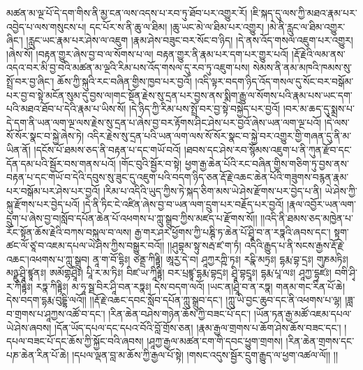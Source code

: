 མཚན་མ་ལྔ་པོ་དེ་དག་གིས་ནི་མྱ་ངན་ལས་འདས་པ་རབ་ཏུ་ཐོབ་པར་འགྱུར་རོ། །ཇི་སྐད་དུ་ལས་ཀྱི་མཐའ་རྣམ་པར་འབྱེད་པ་ལས་གསུངས་པ། དང་པོར་ས་ནི་ཆུ་ལ་ཐིམ། །ཆུ་ཡང་མེ་ལ་ཐིམ་པར་འགྱུར། །མེ་ནི་རླུང་ལ་ཐིམ་འགྱུར་ཞིང་། །རླུང་ཡང་རྣམ་པར་ཤེས་ལ་འཇུག །རྣམ་ཤེས་བཟུང་བར་སོང་བ་ཉིད། །དེ་ནས་འོད་གསལ་འཇུག་པར་འགྱུར། །ཞེས་སོ། །བརྟན་གྱུར་ཞེས་བྱ་བ་ལ་སོགས་པ་ལ། བརྟན་གྱུར་ནི་རྣམ་པར་དག་པར་གྱུར་པའོ། །རྡོ་རྗེའི་ལམ་ནས་འདའ་བར་མི་བྱ་བའི་མཚན་མ་ལྔའི་རིམ་པས་འོད་གསལ་དུ་རབ་ཏུ་འཇུག་པས། སེམས་ནི་ནམ་མཁའི་ཁམས་སུ་སྤྲོ་བར་བྱ་ཞིང་། ཆོས་ཀྱི་སྐུའི་རང་བཞིན་གྱིས་ཁྱབ་པར་བྱའོ། །འདི་ལྟར་བདག་ཉིད་འོད་གསལ་དུ་སོང་བར་བསྒོམ་པར་བྱ་བ་སྟེ་མངོན་སུམ་དུ་བྱས་ལ།གང་སྔོན་རྗེས་སུ་དྲན་པར་བྱས་ནས་སྨིག་རྒྱུ་ལ་སོགས་པའི་རྣམ་པས་ཡང་དག་པའི་མཐའ་ཐོབ་པ་དེའི་རྣམ་པ་ཡིས་སོ། །དེ་ཉིད་ཀྱི་རིམ་པས་སྤྲོ་བར་བྱ་སྟེ་བསྐྱེད་པར་བྱའོ། །བར་མ་ཆད་དུ་སྨྲས་པ་དེ་དག་ནི་ཡན་ལག་ལྔ་ལས་རྗེས་སུ་དྲན་པ་ཞེས་བྱ་བར་རྟོགས་ཤིང་ཤེས་པར་བྱའོ་ཞེས་ཡན་ལག་ལྔ་པའོ། །དེ་ལས་སོ་སོར་སྣང་བ་སྐྱེ་ཞེས་ཏེ། འདིར་རྗེས་སུ་དྲན་པའི་ཡན་ལག་ལས་སོ་སོར་སྣང་བ་སྐྱེ་བར་འགྱུར་གྱི་གཞན་དུ་ནི་མ་ཡིན་ནོ། །དངོས་པོ་ཐམས་ཅད་ནི་བརྟན་པ་དང་གཡོ་བའོ། །ཐབས་དང་ཤེས་རབ་སྙོམས་འཇུག་པ་ནི་ཀུན་རྫོབ་དང་དོན་དམ་པའི་སྦྱོར་བས་གནས་པའོ། །གོང་བུའི་སྦྱོར་བ་སྟེ། ཕྱག་རྒྱ་ཆེན་པོའི་རང་བཞིན་གྱིས་གཅིག་ཏུ་བྱས་ནས་བརྟན་པ་དང་གཡོ་བ་དེའི་དབུས་སུ་ཟུང་དུ་འཇུག་པའི་བདག་ཉིད་ཅན་རྡོ་རྗེ་འཆང་ཆེན་པོའི་གཟུགས་བརྙན་རྣམ་པར་བསྒོམ་པར་ཤེས་པར་བྱའོ། །རིམ་པ་འདིའི་ཡུད་ཀྱིས་ཏེ་སྐད་ཅིག་མས་ཡེ་ཤེས་རྫོགས་པར་བྱེད་པ་ནི། ཡེ་ཤེས་ཀྱི་སྐུ་རྫོགས་པར་བྱེད་པའོ། །དེ་ནི་ཏིང་ངེ་འཛིན་ཞེས་བྱ་བ་ཡན་ལག་དྲུག་པར་བརྗོད་པར་བྱའོ། །རྣལ་འབྱོར་ཡན་ལག་དྲུག་པ་ཞེས་བྱ་བ།སློབ་དཔོན་ཆེན་པོ་འཕགས་པ་ཀླུ་སྒྲུབ་ཀྱིས་མཛད་པ་རྫོགས་སོ།། །།འདི་ནི་ཐམས་ཅད་མཁྱེན་པ་རོང་སྟོན་ཆོས་རྗེའི་བཀས་བསྐུལ་བ་ལས། རྒྱ་གར་ཤར་ཕྱོགས་ཀྱི་པཎྚི་ཏ་ཆེན་པོ་ཤྲཱི་བ་ན་རཏྣའི་ཞབས་དང་། སྟག་ཚང་ལོ་ཙཱ་བ་འཇམ་དཔལ་ཡེ་ཤེས་ཀྱིས་བསྒྱུར་བའོ།། །།ཤུབྷམ་སྟུ་སརྦ་ཛ་ག་ཏཾ། འདིའི་རྒྱུད་པ་ནི་སངས་རྒྱས་རྡོ་རྗེ་འཆང་།འཕགས་པ་ཀླུ་སྒྲུབ། ནཱ་ག་བོ་དྷིཿ། ཙནྡྲ་ཀིརྟྟི། ཨཱརྱ་དེ་བ། ཤཱཀྱརཀྵི་ཏཿ། རངྣི་མཏྲཿ། དྷརྨ་བྷ་དྲཿ། གུཎམཏིཿ། མཉྫུ་ཤྲཱི་ཛྙཱནཿ། ཨམོགྷཤྲཱིཿ། པཱི་ར་མ་ཏིཿ། བིཛ་ཡ་ཀཱིརྟྟི། བར་པྲཛྙཱ་དྷརྨ་བྷདྲཿ། ཤྲཱི་བྷདྲཱཿ། དྷརྨ་པཱ་ལཿ། ཤཱཀྱ་དྷྭཛཿ། བགི་ཤྭི་ར་ཀིརྟྟིཿ། རཏྣ་ཀིརྟྟིཿ། མ་ཧཱ་སྠ་བིར་ཤཱི་བན་རཏྣཿ། དེས་བདག་ལའོ། །ཡང་ན།ཤྲཱི་བ་ན་རཏྣ། གནམ་གང་རིན་པོ་ཆེ། དེས་བདག་དྷརྨ་བུདྔྷི་ལའོ།། །།རྡོ་རྗེ་འཆང་དབང་སློབ་དཔོན་ཀླུ་སྒྲུབ་དང་། །ཀླུ་ཡི་བྱང་ཆུབ་དང་ནི་འཕགས་པ་ལྷ། །ཟླ་བ་གྲགས་པ་ཤཱཀྱས་འཚོ་བ་དང་། །རིན་ཆེན་བཤེས་གཉེན་ཆོས་ཀྱི་བཟང་པོ་དང་། །ཡོན་ཏན་རྒྱ་མཚོ་འཇམ་དཔལ་ཡེ་ཤེས་ཞབས། །དོན་ཡོད་དཔལ་དང་དཔའ་བོའི་བློ་གྲོས་ཅན། །རྣམ་རྒྱལ་གྲགས་པ་ཆོག་ཤེས་ཆོས་བཟང་དང་། །དཔལ་བཟང་པོ་དང་ཆོས་ཀྱི་སྐྱོང་བའི་ཞབས། །ཤཱཀྱ་རྒྱལ་མཚན་ངག་གི་དབང་ཕྱུག་གྲགས། །རིན་ཆེན་གྲགས་དང་པཎ་ཆེན་རིན་པོ་ཆེ། །དཔལ་ལྡན་བླ་མ་ཆོས་ཀྱི་རྒྱལ་པོ་སྟེ། །གསང་འདུས་སྦྱོར་དྲུག་རྒྱུད་ལ་ཕྱག་འཚལ་ལོ།། །།